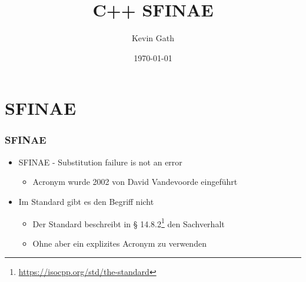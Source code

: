 \documentclass[hyperref={pdfpagelabels=false}]{beamer}
\title{C++ SFINAE}
\author{Kevin Gath}
\date{\today}
\begin{document}
\begin{frame}
\titlepage
\end{frame} 



\section{SFINAE} 
\begin{frame}
\frametitle{SFINAE} 
\begin{itemize}

\item SFINAE - \glqq{}Substitution failure is not an error\grqq
\begin{itemize}
\item Acronym wurde 2002 von David Vandevoorde eingeführt
\end{itemize}

\item Im Standard gibt es den Begriff nicht
\begin{itemize}
\item Der Standard beschreibt in § 14.8.2\footnote{\url{https://isocpp.org/std/the-standard}} den Sachverhalt
\item Ohne aber ein explizites Acronym zu verwenden
\end{itemize}

\end{itemize}

\end{frame}


\end{document}
